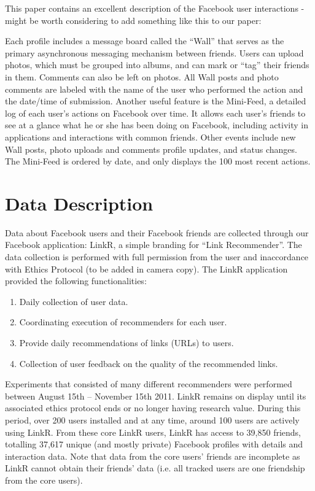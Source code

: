 \documentclass[letterpaper]{article}
\begin{document}
This paper contains an excellent description of the Facebook user interactions - might be worth considering to add something like this to our paper:


Each profile includes a message board called the “Wall” that serves as the primary asynchronous messaging mechanism between friends. Users can upload photos, which must be grouped into albums, and can mark or “tag” their friends in them. Comments can also be left on photos. All Wall posts and photo comments are labeled with the name of the user who performed the action and the date/time of submission. Another useful feature is the Mini-Feed, a detailed log of each user’s actions on Facebook over time. It allows each user’s friends to see at a glance what he or she has been doing on Facebook, including activity in applications and interactions with common friends. Other events include new Wall posts, photo uploads and comments profile updates, and status changes. The Mini-Feed is ordered by date, and only displays the 100 most recent actions.




\section{Data Description}


Data about Facebook users and their Facebook friends are collected through our Facebook application: LinkR, a simple branding for ``Link Recommender''. The data collection is performed with full permission from the user and inaccordance with Ethics Protocol (to be added in camera copy). The LinkR application provided the following functionalities:
\begin{enumerate}
\item Daily collection of user data.
\item Coordinating execution of recommenders for each user.
\item Provide daily recommendations of links (URLs) to users.
\item Collection of user feedback on the quality of the recommended links.
\end{enumerate}
Experiments that consisted of many different recommenders were performed between August 15th -- November 15th 2011. LinkR remains on display until its associated ethics protocol ends or no longer having research value. During this period, over 200 users installed and at any time, around 100 users are actively using LinkR. From these core LinkR users, LinkR has access to 39,850 friends, totalling 37,617 unique (and mostly private) Facebook profiles with details and interaction data. Note that data from the core users' friends are incomplete as LinkR cannot obtain their friends' data (i.e. all tracked users are one friendship from the core users).
\end{document}
